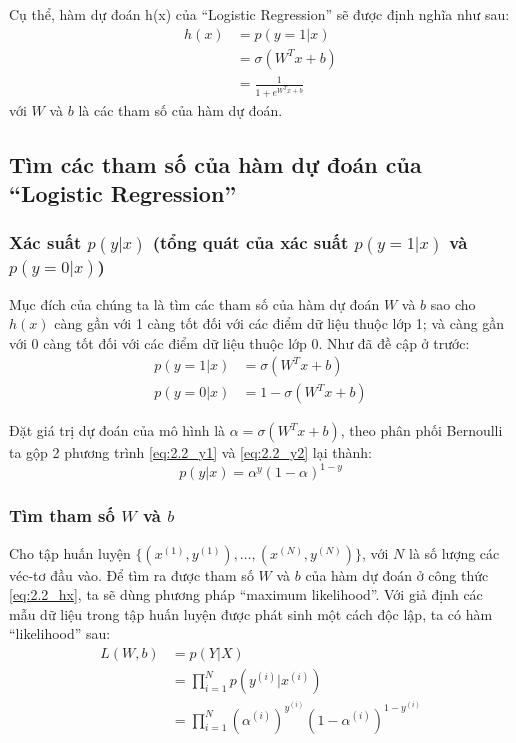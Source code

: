 Cụ thể, hàm dự đoán h(x) của ``Logistic Regression'' sẽ được định nghĩa như sau:
\begin{equation}\label{eq:2.2_hx}
    \begin{split}
        h(x) &= p(y=1|x)\\
        &= \sigma(W^T x + b)\\
        &= \frac{1}{1+ e^{W^T x + b}}
    \end{split}
\end{equation}
với $W$ và $b$ là các tham số của hàm dự đoán.


\subsection{Tìm các tham số của hàm dự đoán của ``Logistic Regression''}
\subsubsection{Xác suất $p(y|x)$ (tổng quát của xác suất $p(y=1|x)$ và $p(y=0|x)$)}
Mục đích của chúng ta là tìm các tham số của hàm dự đoán $W$ và $b$ sao cho $h(x)$ càng gần với 1 càng tốt đối với các điểm dữ liệu thuộc lớp 1; và càng gần với 0 càng tốt đối với các điểm dữ liệu thuộc lớp 0. Như đã đề cập ở trước:
\begin{align}
    p(y=1|x) &= \sigma(W^T x + b) \label{eq:2.2_y1}\\
    p(y=0|x) &= 1 - \sigma(W^T x + b)\label{eq:2.2_y2}
\end{align}

Đặt giá trị dự đoán của mô hình là $\alpha = \sigma(W^T x + b)$, theo phân phối Bernoulli ta gộp 2 phương trình \ref{eq:2.2_y1} và \ref{eq:2.2_y2} lại thành:
\begin{equation}
    p(y|x) = \alpha^y(1-\alpha)^{1-y}
    \label{eq:2.2_alpha}
\end{equation}
\subsubsection{Tìm tham số $W$ và $b$}
Cho tập huấn luyện $\{ (x^{(1)}, y^{(1)}), \dots, (x^{(N)}, y^{(N)}) \}$, với $N$ là số lượng các véc-tơ đầu vào. Để tìm ra được tham số $W$ và $b$ của hàm dự đoán ở công thức \ref{eq:2.2_hx}, ta sẽ dùng phương pháp ``maximum likelihood''. Với giả định các mẫu dữ liệu trong tập huấn luyện được phát sinh một cách độc lập, ta có hàm ``likelihood'' sau:
\begin{equation}\label{eq:2.2_L}
    \begin{split}
        L(W,b) &= p(Y|X)\\
        &= \prod_{i=1}^{N} p(y^{(i)}|x^{(i)})\\
        &= \prod_{i=1}^{N} (\alpha^{(i)})^{y^{(i)}}(1-\alpha^{(i)})^{1-y^{(i)}}
    \end{split}
\end{equation}

